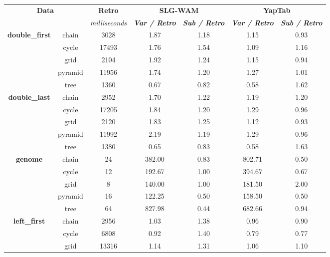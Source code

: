 \begin{table}[ht]
\centering
\footnotesize{
  \begin{tabular}{cc|c|cc|cc}
   \hline
    \hline
    \multicolumn{2}{c|}{\multirow{2}{*}{\small{\textbf{Data}}}} & \textbf{\small{Retro}} & \multicolumn{2}{c|}{\small{\textbf{SLG-WAM}}} & \multicolumn{2}{c}{\small{\textbf{YapTab}}} \\
     \multicolumn{2}{c|}{} & \scriptsize{\textit{milliseconds}} & \textbf{\textit{\scriptsize{Var / Retro}}} & \textbf{\textit{\scriptsize{Sub / Retro}}} & \textbf{\textit{\scriptsize{Var / Retro}}} & \textbf{\textit{\scriptsize{Sub / Retro}}} \\
   \hline
   \hline

\multirow{5}{*}{\textbf{double\_first}} &  chain &  3028 &  1.87  &  1.18  &  1.15 & 0.93 \\
&  cycle &  17493 &  1.76  &  1.54  &  1.09 & 1.16 \\
&  grid &  2104 &  1.92  &  1.24  &  1.15 & 0.94 \\
&  pyramid &  11956 &  1.74  &  1.20  &  1.27 & 1.01 \\
&  tree &  1360 &  0.67  &  0.82  &  0.58 & 1.62 \\
\hline
\multirow{5}{*}{\textbf{double\_last}} &  chain &  2952 &  1.70  &  1.22  &  1.19 & 1.20 \\
&  cycle &  17205 &  1.84  &  1.20  &  1.29 & 0.96 \\
&  grid &  2120 &  1.83  &  1.25  &  1.12 & 0.93 \\
&  pyramid &  11992 &  2.19  &  1.19  &  1.29 & 0.96 \\
&  tree &  1380 &  0.65  &  0.83  &  0.58 & 1.63 \\
\hline
\multirow{5}{*}{\textbf{genome}} &  chain &  24 &  382.00  &  0.83  &  802.71 & 0.50 \\
&  cycle &  12 &  192.67  &  1.00  &  394.67 & 0.67 \\
&  grid &  8 &  140.00  &  1.00  &  181.50 & 2.00 \\
&  pyramid &  16 &  122.25  &  0.50  &  158.50 & 0.50 \\
&  tree &  64 &  827.98  &  0.44  &  682.66 & 0.94 \\
\hline
\multirow{5}{*}{\textbf{left\_first}} &  chain &  2956 &  1.03  &  1.38  &  0.96 & 0.90 \\
&  cycle &  6808 &  0.92  &  1.40  &  0.79 & 0.77 \\
&  grid &  13316 &  1.14  &  1.31  &  1.06 & 1.10 \\

\end{tabular}}
\end{table}
